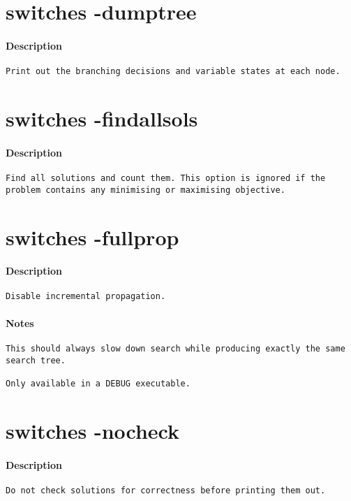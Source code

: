 \section{switches -dumptree}
\paragraph{Description}
{\footnotesize
\begin{verbatim}
Print out the branching decisions and variable states at each node.
\end{verbatim}
}
\section{switches -findallsols}
\paragraph{Description}
{\footnotesize
\begin{verbatim}
Find all solutions and count them. This option is ignored if the
problem contains any minimising or maximising objective.
\end{verbatim}
}
\section{switches -fullprop}
\paragraph{Description}
{\footnotesize
\begin{verbatim}
Disable incremental propagation.
\end{verbatim}
}
\paragraph{Notes}
{\footnotesize
\begin{verbatim}
This should always slow down search while producing exactly the same
search tree.

Only available in a DEBUG executable.
\end{verbatim}
}
\section{switches -nocheck}
\paragraph{Description}
{\footnotesize
\begin{verbatim}
Do not check solutions for correctness before printing them out.
\end{verbatim}
}
